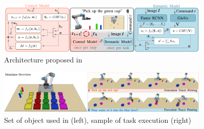 \begin{figure}[htb]
    \centering
    \includegraphics[width=0.9\textwidth]{Figures/images/language_conditioned/architecture.png}
    \caption{Architecture proposed in \cite{stepputtis2020language}}
    \label{fig:language_conditioned}
\end{figure}

\begin{figure}[htb]
    \centering
    \includegraphics[width=0.9\textwidth]{Figures/images/language_conditioned/objects.png}
    \caption{Set of object used in \cite{stepputtis2020language} (left), sample of task execution (right)}
    \label{fig:objects}
\end{figure}
